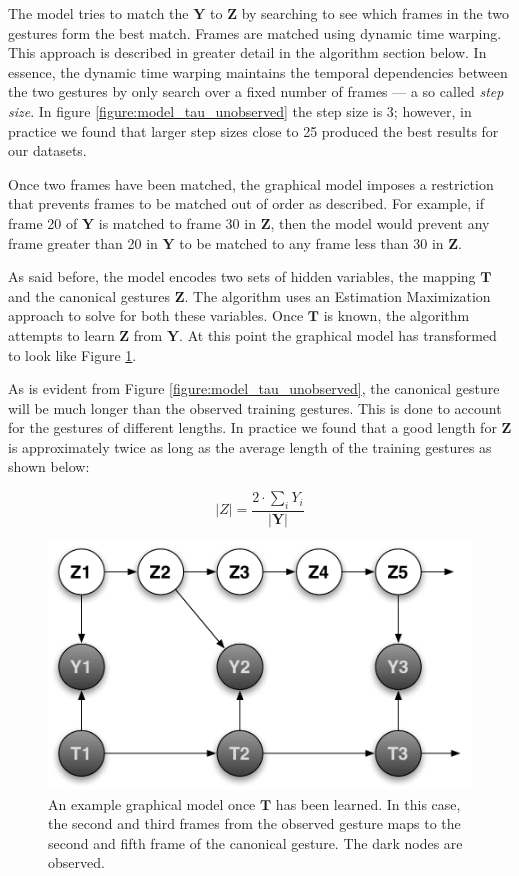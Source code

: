 \documentclass{article}
\begin{document}
The model tries to match the $\mathbf{Y}$ to $\mathbf{Z}$ by searching to see
which frames in the two gestures form the best match. Frames are matched using
dynamic time warping. This approach is described in greater detail in the algorithm section
below. In essence, the dynamic time warping maintains the temporal dependencies
between the two gestures by only search over a fixed number of frames --- a so
called \emph{step size}. In figure \ref{figure:model_tau_unobserved} the step
size is 3; however, in practice we found that larger step sizes close to 25
produced the best results for our datasets.

Once two frames have been matched, the graphical model imposes a restriction
that prevents frames to be matched out of order as described. For example, if
frame 20 of $\mathbf{Y}$ is matched to frame 30 in $\mathbf{Z}$, then the model
would prevent any frame greater than 20 in $\mathbf{Y}$ to be matched to any
frame less than 30 in $\mathbf{Z}$.

As said before, the model encodes two sets of hidden variables, the mapping
$\mathbf{T}$ and the canonical gestures $\mathbf{Z}$. The algorithm uses an
Estimation Maximization approach to solve for both these variables. Once
$\mathbf{T}$ is known, the algorithm attempts to learn $\mathbf{Z}$ from
$\mathbf{Y}$. At this point the graphical model has transformed to look like
Figure \ref{figure:model_tau_observed}.

As is evident from Figure \ref{figure:model_tau_unobserved}, the canonical
gesture will be much longer than the observed training gestures. This is done to
account for the gestures of different lengths. In practice we found that a good
length for $\mathbf{Z}$ is approximately twice as long as the average length of
the training gestures as shown below:

\begin{equation}
\label{lengthZ}
|Z| = \frac{2 \cdot \sum_{i}{Y_i}}{|\mathbf{Y}|}
\end{equation}

\begin{figure}
\begin{centering}
\includegraphics[width=0.63\columnwidth]{figures/model_tau_observed.pdf}

\caption{An example graphical model once $\mathbf{T}$ has been learned. In this
case, the second and third frames from the observed gesture maps to the second
and fifth frame of the canonical gesture. The dark nodes are observed.
\label{figure:model_tau_observed}}

\end{centering}
\end{figure}
\end{document}
